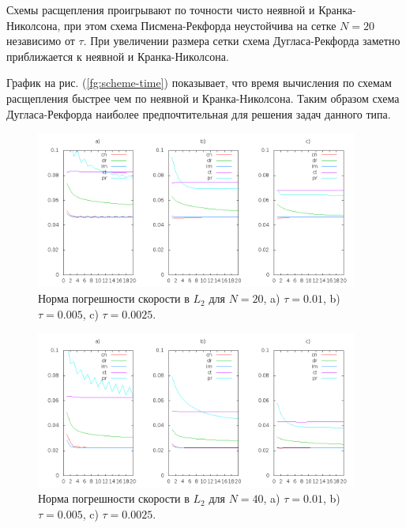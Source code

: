 \documentclass[12pt]{article}
\begin{document}
Схемы расщепления проигрывают по точности чисто неявной и Кранка-Николсона, при этом  схема Писмена-Рекфорда неустойчива на сетке $N=20$ независимо от $\tau$. При увеличении размера сетки схема Дугласа-Рекфорда заметно приближается к неявной и Кранка-Николсона.

График на рис. (\ref{fg:scheme-time}) показывает, что время вычисления по схемам расщепления быстрее чем по неявной и Кранка-Николсона. Таким образом схема Дугласа-Рекфорда наиболее предпочтительная для решения задач данного типа.

\begin{figure}
	\begin{center}
		\includegraphics[width=400px]{data160/error_1}
		\caption{Норма погрешности скорости в $L_2$ для $N=20$, a) $\tau=0.01$, b) $\tau=0.005$, c) $\tau=0.0025$.}
		\label{fg:scheme-L2-1}
	\end{center}
\end{figure}

\begin{figure}
	\begin{center}
		\includegraphics[width=400px]{data160/error_2}
		\caption{Норма погрешности скорости в $L_2$ для $N=40$, a) $\tau=0.01$, b) $\tau=0.005$, c) $\tau=0.0025$.}
		\label{fg:scheme-L2-2}
	\end{center}
\end{figure}
\end{document}
